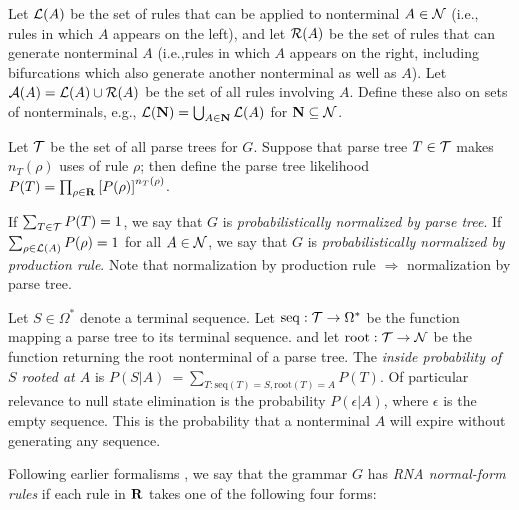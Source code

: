 \documentclass[10pt]{article}
\begin{document}
Let ${\cal L}(A)$ be the set of rules that can be applied to nonterminal $A \in {\cal N}$ (i.e., rules in which $A$ appears on the left),
and let ${\cal R}(A)$ be the set of rules that can generate nonterminal $A$ (i.e.,rules in which $A$ appears on the right, including bifurcations which also generate another nonterminal as well as $A$).
Let ${\cal A}(A) = {\cal L}(A) \cup {\cal R}(A)$ be the set of all rules involving $A$.
Define these also on sets of nonterminals, e.g., ${\cal L}({\bf N}) = \bigcup_{A \in {\bf N}} {\cal L}(A)$ for ${\bf N} \subseteq {\cal N}$.

Let ${\cal T}$ be the set of all parse trees for $G$.
Suppose that parse tree $T \in {\cal T}$ makes $n_T(\rho)$ uses of rule $\rho$;
then define the parse tree likelihood $P(T) = \prod_{\rho \in {\bf R}} \left[ P(\rho) \right]^{n_T(\rho)}$.

If $\sum_{T \in {\cal T}} P(T) = 1$, we say that $G$ is {\em probabilistically normalized by parse tree}.
If $\sum_{\rho \in {\cal L}(A)} P(\rho) = 1$ for all $A \in {\cal N}$, we say that $G$ is {\em probabilistically normalized by production rule}.
Note that normalization by production rule $\Rightarrow$ normalization by parse tree.

Let $S \in \Omega^\ast$ denote a terminal sequence.
Let $\mathrm{seq}:{\cal T} \to \Omega^\ast$ be the function mapping a parse tree to its terminal sequence.
and let $\mathrm{root}:{\cal T} \to {\cal N}$ be the function returning the root nonterminal of a parse tree.
The {\em inside probability of $S$ rooted at $A$} is $P(S|A)\ = \sum_{T: \mathrm{seq}(T) = S,\mathrm{root}(T) = A} P(T)$.
Of particular relevance to null state elimination is the probability $P(\epsilon|A)$,
where $\epsilon$ is the empty sequence.
This is the probability that a nonterminal $A$ will expire without generating any sequence.

Following earlier formalisms \cite{Durbin98,HolmesRubin2002a,Holmes2005},
we say that the grammar $G$ has {\em RNA normal-form rules} if
each rule in ${\bf R}$ takes one of the following four forms:
\end{document}
